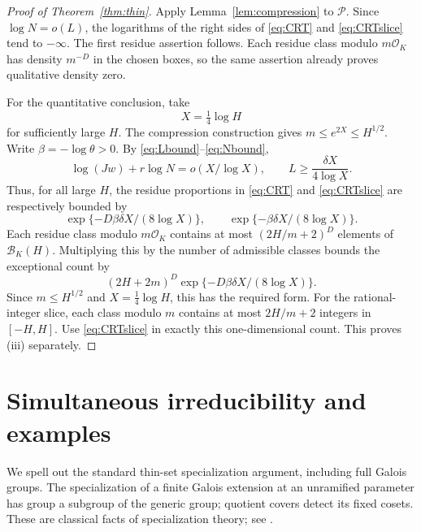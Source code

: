 \documentclass[11pt,a4paper]{article}
\theoremstyle{definition}
\theoremstyle{remark}
\newcommand{\OK}{\mathcal O_K}
\newcommand{\cP}{\mathcal P}
\newcommand{\cB}{\mathcal B}
\begin{document}
\begin{proof}[Proof of Theorem~\ref{thm:thin}]
Apply Lemma~\ref{lem:compression} to $\cP$. Since
$\log N=o(L)$, the logarithms of the right sides of
\eqref{eq:CRT} and \eqref{eq:CRTslice} tend to $-\infty$. The first
residue assertion follows. Each residue class modulo $m\OK$ has density
$m^{-D}$ in the chosen boxes, so the same assertion already proves
qualitative density zero.

For the quantitative conclusion, take
\[
 X=\tfrac14\log H
\]
for sufficiently large $H$. The compression construction gives
$m\le e^{2X}\le H^{1/2}$. Write $\beta=-\log\theta>0$.
By \eqref{eq:Lbound}--\eqref{eq:Nbound},
\[
 \log(Jw)+r\log N=o(X/\log X),
 \qquad L\ge\frac{\delta X}{4\log X}.
\]
Thus, for all large $H$, the residue proportions in
\eqref{eq:CRT} and \eqref{eq:CRTslice} are respectively bounded by
\[
 \exp\{-D\beta\delta X/(8\log X)\},
 \qquad \exp\{-\beta\delta X/(8\log X)\}.
\]
Each residue class modulo $m\OK$ contains at most
$(2H/m+2)^D$ elements of $\cB_K(H)$. Multiplying this by the number of
admissible classes bounds the exceptional count by
\[
 (2H+2m)^D\exp\{-D\beta\delta X/(8\log X)\}.
\]
Since $m\le H^{1/2}$ and $X=\frac14\log H$, this has the required form.
For the rational-integer slice, each class modulo $m$ contains at most
$2H/m+2$ integers in $[-H,H]$. Use \eqref{eq:CRTslice} in exactly this
one-dimensional count. This proves (iii) separately.
\end{proof}

\section{Simultaneous irreducibility and examples}

We spell out the standard thin-set specialization argument, including
full Galois groups. The specialization of a finite Galois extension at
an unramified parameter has group a subgroup of the generic group;
quotient covers detect its fixed cosets. These are classical facts of
specialization theory; see \cite[Proposition~3.3.1]{Serre}.
\end{document}
